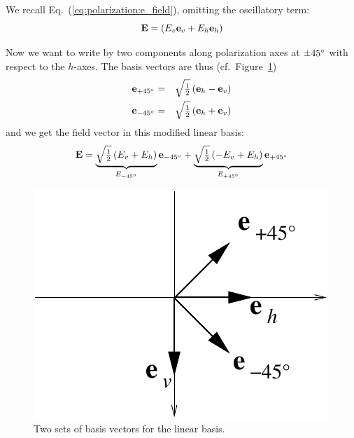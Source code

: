 We recall Eq.~(\ref{eq:polarization:e_field}), omitting the
oscillatory term:
\begin{equation}
  \label{eq:polarization:E_linbase}
  \mathbf{E}= \left(E_v \mathbf{e}_v +  E_h \mathbf{e}_h \right) 
\end{equation}

Now we want to write  by two components along polarization axes at
$\pm 45^\circ$ with respect to the $h$-axes. The basis vectors are
thus (cf.\ Figure~\ref{fig:polarization:e45})
\begin{eqnarray}
  \label{eq:polarization:e_p45}
  \mathbf{e}_{+45^\circ} &=& \sqrt{\textstyle\frac{1}{2}} \left( \mathbf{e}_h - \mathbf{e}_v \right) \\
  \label{eq:polarization:e_m45}
  \mathbf{e}_{-45^\circ} &=& \sqrt{\textstyle\frac{1}{2}} \left( \mathbf{e}_h + \mathbf{e}_v \right) 
\end{eqnarray}
and we get the field vector in this modified linear basis:
\begin{equation}
  \label{eq:polarization:E_lin45base}
  \mathbf{E} = \underbrace{
               \sqrt{\textstyle\frac{1}{2}}\left(E_v +  E_h \right)}_{E_{-45^\circ}} 
               \mathbf{e}_{-45^\circ} 
              + \underbrace{
               \sqrt{\textstyle\frac{1}{2}}\left( -E_v +  E_h \right)}_{E_{+45^\circ}} 
               \mathbf{e}_{+45^\circ} 
\end{equation}
%
\begin{figure}[!h]
 \begin{center}
  \begin{minipage}[c]{0.9\textwidth}
   \begin{center}
    \includegraphics*[width=0.4\hsize]{Figs/polarization/pol_e45}
   \end{center}
  \end{minipage}
  \begin{minipage}[c]{0.9\textwidth}
   \caption{Two sets of basis vectors for the linear basis.}
   \label{fig:polarization:e45}
  \end{minipage}
 \end{center}
\end{figure}   

